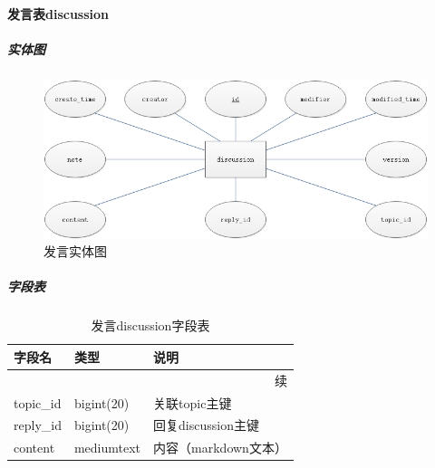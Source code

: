 \documentclass[titlepage,UTF8,linespread=1.5]{ctexart}
\begin{document}
\paragraph{发言表discussion}
\subparagraph{实体图}
\begin{figure}[H]
    \centering
    \includegraphics[width=140mm]{entity-discussion.png}
    \caption{发言实体图}
    \label{fig:entity-discussion}
\end{figure}
\subparagraph{字段表}
\begin{longtable}{|p{10em}|p{6em}|p{15em}|}
    \caption{发言discussion字段表}\label{tab:table_discussion} \\\hline
    字段名         & 类型         & 说明                       \\\hline
    \endfirsthead
    \multicolumn{3}{r}{{续\tablename\thetable{}}}              \\\hline
    \endhead
    topic\_id      & bigint(20)   & 关联topic主键              \\\hline
    reply\_id      & bigint(20)   & 回复discussion主键         \\\hline
    content        & mediumtext   & 内容（markdown文本）       \\\hline
\end{longtable}\par
\end{document}
